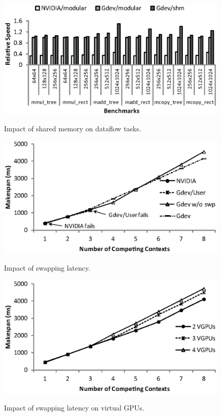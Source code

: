 \begin{figure}[t]
 \begin{center}
  \includegraphics[width=\hsize]{eps/dataflow.eps}\\
  \vspace{-1.5em}
  \caption{Impact of shared memory on dataflow tasks.}
  \label{fig:dataflow}
 \end{center}
 \vspace{-1.5em}
 \begin{center}
  \includegraphics[width=0.75\hsize]{eps/swapping.eps}\\
  \vspace{-1.5em}
  \caption{Impact of swapping latency.}
  \label{fig:swapping}
 \end{center}
 \vspace{-1.5em}
 \begin{center}
  \includegraphics[width=0.75\hsize]{eps/swapping_vgpu.eps}\\
  \vspace{-1.5em}
  \caption{Impact of swapping latency on virtual GPUs.}
  \label{fig:swapping_vgpu}
 \end{center}
 \vspace{-1.5em}
\end{figure}

